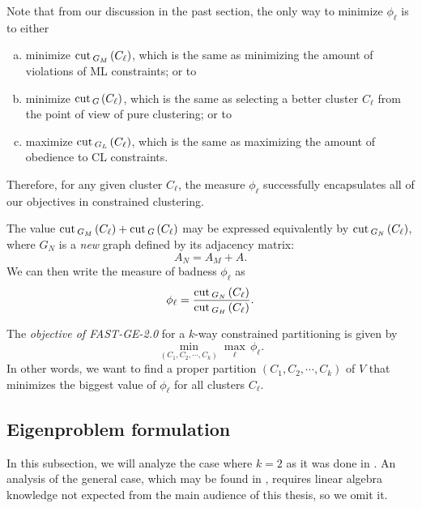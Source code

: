 Note that from our discussion in the past section, the only way to minimize $\phi_\ell$ is to either
\begin{enumerate}[(a)]
   \item minimize $\operatorname{cut\,}_{G_M\,}(C_\ell)$, which is the same as minimizing the amount of violations of ML constraints; or to
   \item minimize $\operatorname{cut\,}_{G\,}(C_\ell)$, which is the same as selecting a better cluster $C_\ell$ from the point of view of pure clustering; or to
   \item maximize $\operatorname{cut\,}_{G_L\,}(C_\ell)$, which is the same as maximizing the amount of obedience to CL constraints.
\end{enumerate}

Therefore, for any given cluster $C_\ell$, the measure $\phi_\ell$ successfully encapsulates all of our objectives in constrained clustering.

\begin{remark}
   The value $\operatorname{cut\,}_{G_M\,}(C_\ell) + \operatorname{cut\,}_{G\,}(C_\ell)$ may be expressed equivalently by $\operatorname{cut\,}_{G_N\,}(C_\ell)$, where $G_N$ is a \textit{new} graph defined by its adjacency matrix:
   \begin{equation}
      A_N = A_M+A.
   \end{equation}
   We can then write the measure of badness $\phi_\ell$ as
   \begin{equation}
      \phi_\ell = \frac{\operatorname{cut\,}_{G_N\,}(C_\ell)}{\operatorname{cut\,}_{G_H\,}(C_\ell)}.
   \end{equation}
\end{remark}


\begin{definition}
   The \textit{objective of FAST-GE-2.0} for a $k$-way constrained partitioning is given by
   \begin{equation}\label{objective}
      \min_{(C_1, C_2, \cdots, C_k)} \max_{\ell} \, \phi _\ell.
   \end{equation}
   In other words, we want to find a proper partition $(C_1, C_2, \cdots, C_k)$ of $V$ that minimizes the biggest value of $\phi_\ell$ for all clusters $C_\ell$.
\end{definition}

\subsection{Eigenproblem formulation}
In this subsection, we will analyze the case where $k = 2$ as it was done in \cite{fastge2}.
An analysis of the general case, which may be found in \cite{fastge1}, requires linear algebra knowledge not expected from the main audience of this thesis, so we omit it.

